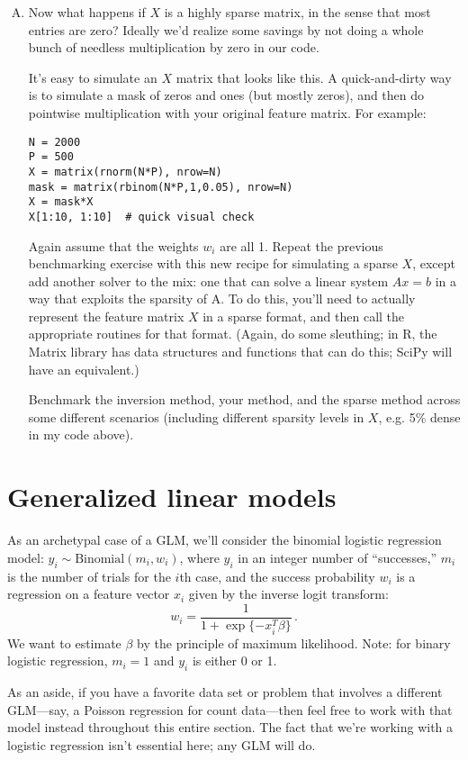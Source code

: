 \documentclass{mynotes}
\begin{document}
\begin{enumerate}[(A)]
\item Now what happens if $X$ is a highly sparse matrix, in the sense that most entries are zero?  Ideally we'd realize some savings by not doing a whole bunch of needless multiplication by zero in our code.

It's easy to simulate an $X$ matrix that looks like this.  A quick-and-dirty way is to simulate a mask of zeros and ones (but mostly zeros), and then do pointwise multiplication with your original feature matrix.  For example:
\begin{verbatim}
N = 2000
P = 500
X = matrix(rnorm(N*P), nrow=N)
mask = matrix(rbinom(N*P,1,0.05), nrow=N)
X = mask*X
X[1:10, 1:10]  # quick visual check
\end{verbatim}

Again assume that the weights $w_i$ are all 1.  Repeat the previous benchmarking exercise with this new recipe for simulating a sparse $X$, except add another solver to the mix: one that can solve a linear system $Ax = b$ in a way that exploits the sparsity of A.  To do this, you'll need to actually represent the feature matrix $X$ in a sparse format, and then call the appropriate routines  for that format.  (Again, do some sleuthing; in R, the Matrix library has data structures and functions that can do this; SciPy will have an equivalent.)

Benchmark the inversion method, your method, and the sparse method across some different scenarios (including different sparsity levels in $X$, e.g. 5\% dense in my code above).
\end{enumerate}


\section{Generalized linear models}

As an archetypal case of a GLM, we'll consider the binomial logistic regression model: $y_i \sim \mbox{Binomial}(m_i, w_i)$, where $y_i$ in an integer number of ``successes,'' $m_i$ is the number of trials for the $i$th case, and the success probability $w_i$ is a regression on a feature vector $x_i$ given by the inverse logit transform:
$$
w_i = \frac{1}{1 + \exp\{-x_i^T \beta\}} \, .
$$
We want to estimate $\beta$ by the principle of maximum likelihood.  Note: for binary logistic regression, $m_i = 1$ and $y_i$ is either 0 or 1.

As an aside, if you have a favorite data set or problem that involves a different GLM---say, a Poisson regression for count data---then feel free to work with that model instead throughout this entire section.  The fact that we're working with a logistic regression isn't essential here; any GLM will do.
\end{document}
